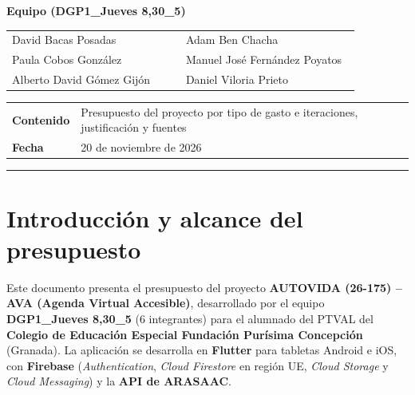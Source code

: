 \documentclass[11pt,a4paper]{article}
\begin{document}
\begin{titlepage}
  {\large\bfseries\color{avaprimary} Equipo (DGP1\_Jueves 8,30\_5)\par}
  \vspace{0.22cm}
  \begin{tabular}{@{}L{0.48\linewidth}L{0.48\linewidth}@{}}
    David Bacas Posadas & Adam Ben Chacha \\
    Paula Cobos González & Manuel José Fernández Poyatos \\
    Alberto David Gómez Gijón & Daniel Viloria Prieto \\
  \end{tabular}

  \vspace{0.35cm}
  \begin{tabularx}{\linewidth}{@{}l X@{}}
    {\bfseries\color{avaprimary} Contenido} & Presupuesto del proyecto por tipo de gasto e iteraciones, justificación y fuentes \\
    {\bfseries\color{avaprimary} Fecha} & 20 de noviembre de 2026 \\
  \end{tabularx}

  \vspace{0.4cm}
  {\color{avaaccent}\rule{\linewidth}{1.5pt}\par}
\end{titlepage}

\setcounter{page}{1}
\tableofcontents
\newpage

\section{Introducción y alcance del presupuesto}

Este documento presenta el presupuesto del proyecto \textbf{AUTOVIDA (26-175) -- AVA (Agenda Virtual Accesible)}, desarrollado por el equipo \textbf{DGP1\_Jueves 8,30\_5} (6 integrantes) para el alumnado del PTVAL del \textbf{Colegio de Educación Especial Fundación Purísima Concepción} (Granada). La aplicación se desarrolla en \textbf{Flutter} para tabletas Android e iOS, con \textbf{Firebase} (\textit{Authentication}, \textit{Cloud Firestore} en región UE, \textit{Cloud Storage} y \textit{Cloud Messaging}) y la \textbf{API de ARASAAC}.
\end{document}
